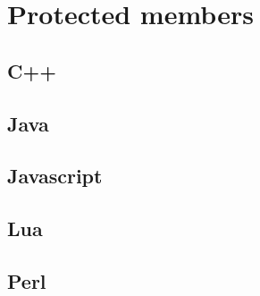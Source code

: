 \documentclass{KodeBook}
\begin{document}
%
%
%
%
%
%
%
%


\section{Protected members}

\subsection{C++}

%

\subsection{Java}

%

\subsection{Javascript} 

%

%


\subsection{Lua}


\subsection{Perl}
\end{document}
